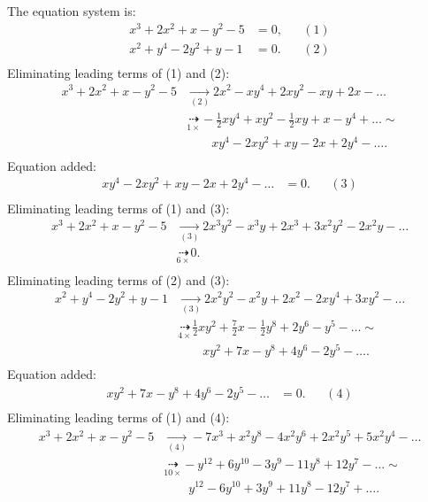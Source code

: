 {\scriptsize
The equation system is:
\begin{align*}
x^{3}+2x^{2}+x-y^{2}-5&= 0, &&(1)\\
x^{2}+y^{4}-2y^{2}+y-1&= 0. &&(2)\\
\end{align*}
Eliminating leading terms of (1) and (2):
\begin{align*}
x^{3}+2x^{2}+x-y^{2}-5&\underset{(2)}{\rightarrow}2x^{2}-xy^{4}+2xy^{2}-xy+2x-\ldots
\\ &\underset{1\times}{\dashrightarrow}-\frac{1}{2}xy^{4}+xy^{2}-\frac{1}{2}xy+x-y^{4}+\ldots
\sim \\ &\qquad xy^{4}-2xy^{2}+xy-2x+2y^{4}-\ldots
.\\ \end{align*}
Equation added:
\begin{align*}
xy^{4}-2xy^{2}+xy-2x+2y^{4}-\ldots&= 0. &&(3)\\
\end{align*}
Eliminating leading terms of (1) and (3):
\begin{align*}
x^{3}+2x^{2}+x-y^{2}-5&\underset{(3)}{\rightarrow}2x^{3}y^{2}-x^{3}y+2x^{3}+3x^{2}y^{2}-2x^{2}y-\ldots
\\ &\underset{6\times}{\dashrightarrow}0
.\\ \end{align*}
Eliminating leading terms of (2) and (3):
\begin{align*}
x^{2}+y^{4}-2y^{2}+y-1&\underset{(3)}{\rightarrow}2x^{2}y^{2}-x^{2}y+2x^{2}-2xy^{4}+3xy^{2}-\ldots
\\ &\underset{4\times}{\dashrightarrow}\frac{1}{2}xy^{2}+\frac{7}{2}x-\frac{1}{2}y^{8}+2y^{6}-y^{5}-\ldots
\sim \\ &\qquad xy^{2}+7x-y^{8}+4y^{6}-2y^{5}-\ldots
.\\ \end{align*}
Equation added:
\begin{align*}
xy^{2}+7x-y^{8}+4y^{6}-2y^{5}-\ldots&= 0. &&(4)\\
\end{align*}
Eliminating leading terms of (1) and (4):
\begin{align*}
x^{3}+2x^{2}+x-y^{2}-5&\underset{(4)}{\rightarrow}-7x^{3}+x^{2}y^{8}-4x^{2}y^{6}+2x^{2}y^{5}+5x^{2}y^{4}-\ldots
\\ &\underset{10\times}{\dashrightarrow}-y^{12}+6y^{10}-3y^{9}-11y^{8}+12y^{7}-\ldots
\sim \\ &\qquad y^{12}-6y^{10}+3y^{9}+11y^{8}-12y^{7}+\ldots
.\\ \end{align*}
}
